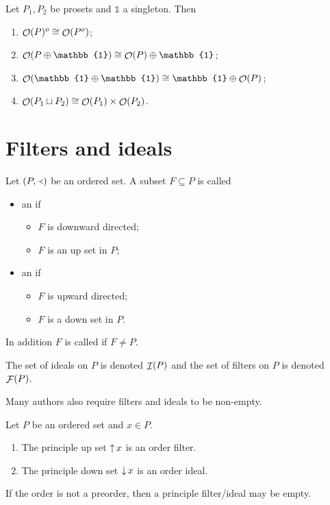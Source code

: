 \begin{lemma}
Let $P_1,P_2$ be prosets and $\mathbb{1}$ a singleton. Then
\begin{enumerate}
\item $\mathop{\mathcal{O}}(P)^o \cong \mathop{\mathcal{O}}(P^o)$;
\item $\downsets(P\oplus \mathbb{1}) \cong \downsets(P)\oplus \mathbb{1}$;
\item $\downsets(\mathbb{1}\oplus \mathbb{1}) \cong \mathbb{1}\oplus \downsets(P)$;
\item $\mathop{\mathcal{O}}(P_1\sqcup P_2)\cong \mathop{\mathcal{O}}(P_1)\times \mathop{\mathcal{O}}(P_2)$.
\end{enumerate}
\end{lemma}

\section{Filters and ideals}
\begin{definition}
Let $\left( P,\Yleft \right)$ be an ordered set. A subset $F\subseteq P$ is called
\begin{itemize}
\item an  if
\begin{itemize}
\item $F$ is downward directed;
\item $F$ is an up set in $P$;
\end{itemize}
\item an  if
\begin{itemize}
\item $F$ is upward directed;
\item $F$ is a down set in $P$.
\end{itemize}
\end{itemize}
In addition $F$ is called  if $F \neq P$.

The set of ideals on $P$ is denoted $\mathop{\mathcal{I}}(P)$ and the set of filters on $P$ is denoted $\mathop{\mathcal{F}}(P)$.
\end{definition}
Many authors also require filters and ideals to be non-empty.

\begin{lemma}
Let $P$ be an ordered set and $x\in P$.
\begin{enumerate}
\item The principle up set $\mathop{\uparrow} x$ is an order filter.
\item The principle down set $\mathop{\downarrow} x$ is an order ideal.
\end{enumerate}
\end{lemma}
If the order is not a preorder, then a principle filter/ideal may be empty.

